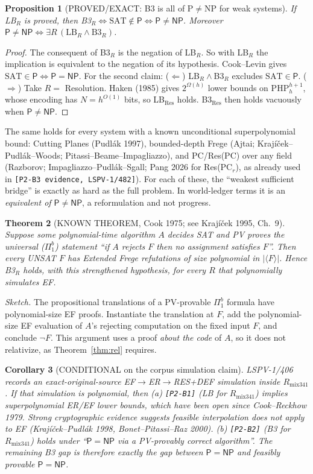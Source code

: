 \documentclass[11pt]{article}
\newtheorem{theorem}{Theorem}
\newtheorem{corollary}[theorem]{Corollary}
\newtheorem{proposition}[theorem]{Proposition}
\theoremstyle{definition}
\theoremstyle{remark}
\newcommand{\NP}{\mathsf{NP}}
\newcommand{\Pc}{\mathsf{P}}
\begin{document}
\begin{proposition}[PROVED/EXACT: B3 is all of P$\neq$NP for weak systems]\label{prop:weak}
If LB$_R$ is \emph{proved}, then B3$_R\iff\mathrm{SAT}\notin\Pc\iff\Pc\neq\NP$.
Moreover $\Pc\neq\NP\iff\exists R\,(\mathrm{LB}_R\wedge\mathrm{B3}_R)$.
\end{proposition}
\begin{proof}
The consequent of B3$_R$ is the negation of LB$_R$. So with LB$_R$ the implication is
equivalent to the negation of its hypothesis. Cook--Levin gives $\mathrm{SAT}\in\Pc\iff\Pc=\NP$.
For the second claim: ($\Leftarrow$) LB$_R\wedge$B3$_R$ excludes $\mathrm{SAT}\in\Pc$.
($\Rightarrow$) Take $R=$ Resolution. Haken (1985) gives $2^{\Omega(h)}$ lower bounds on
$\mathrm{PHP}^{h+1}_h$, whose encoding has $N=h^{O(1)}$ bits, so LB$_{\mathrm{Res}}$ holds.
B3$_{\mathrm{Res}}$ then holds vacuously when $\Pc\neq\NP$.
\end{proof}
The same holds for every system with a known unconditional superpolynomial bound:
Cutting Planes (Pudlák 1997), bounded-depth Frege (Ajtai; Krajíček--Pudlák--Woods;
Pitassi--Beame--Impagliazzo), and PC/Res(PC) over any field (Razborov; Impagliazzo--Pudlák--Sgall;
Pang 2026 for Res(PC$_r$), as already used in \texttt{[P2-B3 evidence, LSPV-1/482]}).
For each of these, the ``weakest sufficient bridge'' is exactly as hard as the full problem.
In world-ledger terms it is an \emph{equivalent of $\Pc\neq\NP$}, a reformulation and not
progress.

\begin{theorem}[KNOWN THEOREM, Cook 1975; see Krajíček 1995, Ch.~9]\label{thm:cook}
Suppose some polynomial-time algorithm $A$ decides SAT and PV proves the universal
($\Pi^b_1$) statement ``if $A$ rejects $F$ then no assignment satisfies $F$''. Then every
UNSAT $F$ has Extended Frege refutations of size polynomial in $|\langle F\rangle|$.
Hence B3$_R$ holds, with this strengthened hypothesis, for every $R$ that polynomially
simulates EF.
\end{theorem}
\textit{Sketch.} The propositional translations of a PV-provable $\Pi^b_1$ formula have
polynomial-size EF proofs. Instantiate the translation at $F$, add the polynomial-size
EF evaluation of $A$'s rejecting computation on the fixed input $F$, and conclude
$\neg F$. This argument uses a proof \emph{about the code} of $A$, so it does not relativize,
as Theorem~\ref{thm:rel} requires.

\begin{corollary}[CONDITIONAL on the corpus simulation claim]
LSPV-1/406 records an exact-original-source EF$\to$ER$\to$RES+DEF simulation inside
$R_{\mathrm{mix341}}$. If that simulation is polynomial, then
(a) \texttt{[P2-B1]} (LB for $R_{\mathrm{mix341}}$) implies superpolynomial ER/EF lower bounds,
which have been open since Cook--Reckhow 1979. Strong cryptographic evidence suggests feasible
interpolation does not apply to EF (Krajíček--Pudlák 1998, Bonet--Pitassi--Raz 2000).
(b) \texttt{[P2-B2]} (B3 for $R_{\mathrm{mix341}}$) holds under ``$\Pc=\NP$ via a
PV-provably correct algorithm''. The remaining B3 gap is therefore exactly the gap between
$\Pc=\NP$ and \emph{feasibly provable} $\Pc=\NP$.
\end{corollary}
\end{document}
